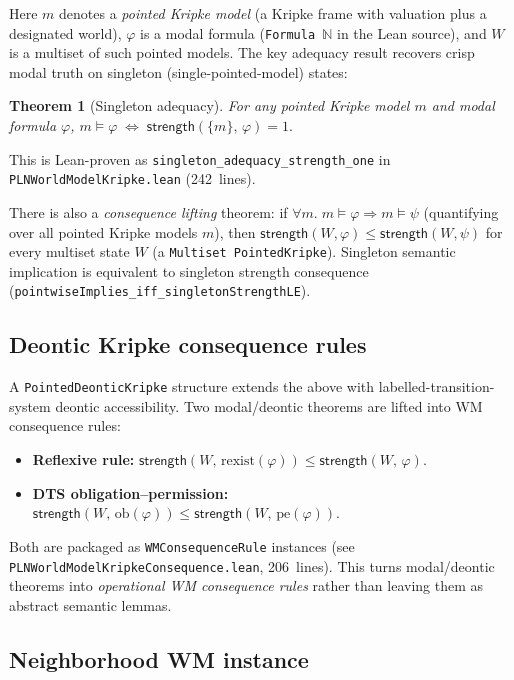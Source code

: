 \documentclass[]{article}
\newtheorem{theorem}{Theorem}
\newcommand{\code}[1]{\texttt{#1}}
\newcommand{\Strength}{\mathsf{strength}}
\begin{document}
Here $m$ denotes a \emph{pointed Kripke model} (a Kripke frame with
valuation plus a designated world), $\varphi$ is a modal formula
(\code{Formula~$\mathbb{N}$} in the Lean source), and $W$ is a multiset
of such pointed models.
The key adequacy result recovers crisp modal truth on singleton
(single-pointed-model) states:

\begin{theorem}[Singleton adequacy]
\label{thm:singleton-kripke}
For any pointed Kripke model $m$ and modal formula $\varphi$,
$m \models \varphi \;\iff\; \Strength(\{m\},\,\varphi) = 1.$
\end{theorem}

\noindent
This is Lean-proven as \code{singleton\_adequacy\_strength\_one} in
\code{PLNWorldModelKripke.lean} (242~lines).

There is also a \emph{consequence lifting} theorem: if
$\forall m.\;m \models \varphi \Rightarrow m \models \psi$ (quantifying
over all pointed Kripke models $m$), then
$\Strength(W,\varphi) \le \Strength(W,\psi)$ for every multiset state
$W$ (a \code{Multiset PointedKripke}).
Singleton semantic implication is equivalent to singleton strength
consequence (\code{pointwiseImplies\_iff\_singletonStrengthLE}).


\subsection{Deontic Kripke consequence rules}
\label{sec:deontic-kripke}

A \code{PointedDeonticKripke} structure extends the above with
labelled-transition-system deontic accessibility. Two modal/deontic
theorems are lifted into WM consequence rules:

\begin{itemize}[leftmargin=2em]
\item \textbf{Reflexive rule:}
  $\Strength(W,\,\mathrm{rexist}(\varphi)) \le \Strength(W,\,\varphi)$.
\item \textbf{DTS obligation--permission:}
  $\Strength(W,\,\mathrm{ob}(\varphi)) \le \Strength(W,\,\mathrm{pe}(\varphi))$.
\end{itemize}

\noindent
Both are packaged as \code{WMConsequenceRule} instances (see
\code{PLNWorldModelKripkeConsequence.lean}, 206~lines). This turns
modal/deontic theorems into \emph{operational WM consequence rules}
rather than leaving them as abstract semantic lemmas.


\subsection{Neighborhood WM instance}
\label{sec:neighborhood-wm}
\end{document}

